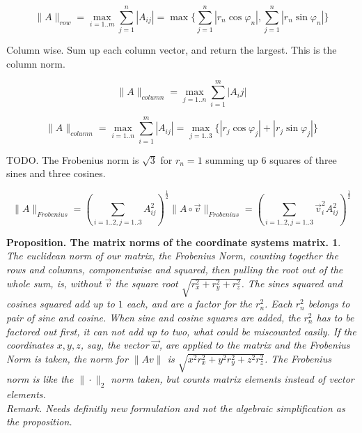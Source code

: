\documentclass[a4paper]{article}
\begin{document}
\begin{Example}
\begin{displaymath}
\|A\|_{row} = \max_{i=1..m} { \sum_{j=1}^{n} |A_{ij}| } = \max\{ \sum_{j=1}^{n} |r_n\cos\varphi_n|, \sum_{j=1}^{n} |r_n\sin\varphi_n| \}
\end{displaymath}


Column wise. Sum up each column vector, and return the largest. This is the column norm.

\begin{displaymath}
\|A\|_{column} = \max_{j=1..n} { \sum_{i=1}^{m} |A_{i}j| }
\end{displaymath}

\begin{displaymath}
\|A\|_{column} = \max_{i=1..n} { \sum_{i=1}^{m} |A_{ij}| } = \max_{j=1..3}\{ |r_j\cos\varphi_j| + |r_j\sin\varphi_j| \}
\end{displaymath}

TODO. The Frobenius norm is $\sqrt{3}$ for $r_n = 1$ summing up 6 squares of three sines and three cosines.

\begin{displaymath}
\|A\|_{Frobenius} = (\sum_{i=1..2,j=1..3}A_{ij}^{2})^{\frac12}
\|A\circ\vec{v}\|_{Frobenius} = (\sum_{i=1..2,j=1..3}\vec{v}_{i}^{2}A_{ij}^{2})^{\frac12}
\end{displaymath}


\newtheorem{PropositionMatrixNorm}{Proposition. The matrix norms of the coordinate systems matrix.}
\begin{PropositionMatrixNorm}
\label{proposition_matrix_norm}
The euclidean norm of our matrix, the Frobenius Norm, counting together the rows and columns, componentwise and squared, then pulling the root out of the whole sum, is, without $\vec{v}$ the square root $\sqrt{r_{x}^{2}+r_{y}^{2}+r_{z}^{2}}$. The sines squared and cosines squared add up to $1$ each, and are a factor for the $r_{n}^{2}$. Each $r_{n}^{2}$ belongs to pair of sine and cosine. When sine and cosine squares are added, the $r_{n}^{2}$ has to be factored out first, it can not add up to two, what could be miscounted easily. If the coordinates $x,y,z$, say, the vector $\vec{w}$, are applied to the matrix and the Frobenius Norm is taken, the norm for $\|Av\|$ is $\sqrt{x^{2}r_{x}^{2}+y^{2}r_{y}^{2}+z^{2}r_{z}^{2}}$. The Frobenius norm is like the $\|\cdot\|_{2}$ norm taken, but counts matrix elements instead of vector elements.\\

Remark. Needs definitly new formulation and not the algebraic simplification as the proposition.\\


\end{PropositionMatrixNorm}
\end{Example}
\end{document}
